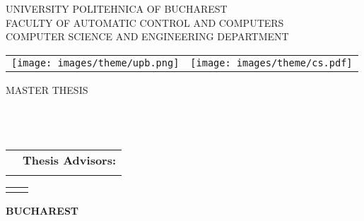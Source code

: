 \newcommand{\frontPage}[6]{
    \begin{titlepage}
        \begin{center}
            {\Large #1}
            \vspace{50pt}
            \begin{tabular}{p{6cm}p{4cm}}
                \texttt{[image: images/theme/upb.png]} &
                \texttt{[image: images/theme/cs.pdf]}
            \end{tabular}

            \vspace{105pt}
            {\Huge #2} \\
            \vspace{40pt}
            {\Large #3} \\ \vspace{0pt}
            {\Large #4} \\
            \vspace{40pt}
            {\LARGE \detailstudentname} \\
        \end{center}
        \vspace{60pt}
        \begin{tabular*}{\textwidth}{@{\extracolsep{\fill}}p{6cm}r}
            &{\large\textbf{#5}}\vspace{10pt} \\
            &{\large \detailadvisor}
        \end{tabular*}
        \begin{tabular*}{\textwidth}{@{\extracolsep{\fill}}p{6cm}r}
            &{\large \detailsecondaryadvisor}
        \end{tabular*}
        \vspace{20pt}
        \begin{center}
            {\large\textbf{\City}}\\
            \vspace{0pt}
            {\normalsize \detailyear}
        \end{center}
    \end{titlepage}
}

\newcommand{\UniTextEN}{
    UNIVERSITY POLITEHNICA OF BUCHAREST \\[\HeaderLineSpace]
    FACULTY OF AUTOMATIC CONTROL AND COMPUTERS \\[\HeaderLineSpace]
    COMPUTER SCIENCE AND ENGINEERING DEPARTMENT\\
}
\newcommand{\DiplomaEN}{MASTER THESIS}
\newcommand{\City}{BUCHAREST}

\newcommand{\frontPageEN}{\frontPage{\UniTextEN}{\DiplomaEN}{\detailtitle}{\detailsubtitle}{Thesis Advisors:}{\BucEN}}

\frontPageEN